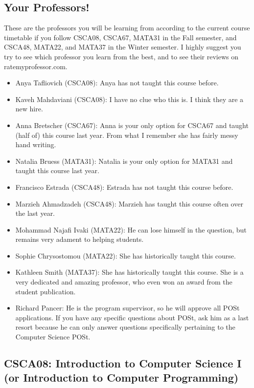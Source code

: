 \documentclass[11pt]{article}
\begin{document}
\subsection{Your Professors!}
These are the professors you will be learning from according to the current course timetable if you follow CSCA08, CSCA67, MATA31 in the Fall semester, and CSCA48, MATA22, and MATA37 in the Winter semester. I highly suggest you try to see which professor you learn from the best, and to see their reviews on ratemyprofessor.com.
\begin{itemize}
    \item Anya Tafliovich (CSCA08): Anya has not taught this course before.
    \item Kaveh Mahdaviani (CSCA08): I have no clue who this is. I think they are a new hire.
    \item Anna Bretscher (CSCA67): Anna is your only option for CSCA67 and taught (half of) this course last year. From what I remember she has fairly messy hand writing.
    \item Natalia Bruess (MATA31): Natalia is your only option for MATA31 and taught this course last year. 
    \item Francisco Estrada (CSCA48): Estrada has not taught this course before.
    \item Marzieh Ahmadzadeh (CSCA48): Marzieh has taught this course often over the last year.
    \item Mohammad Najafi Ivaki (MATA22): He can lose himself in the question, but remains very adament to helping students.
    \item Sophie Chrysostomou (MATA22): She has historically taught this course.
    \item Kathleen Smith (MATA37): She has historically taught this course. She is a very dedicated and amazing professor, who even won an award from the student publication.
    \item Richard Pancer: He is the program supervisor, so he will approve all POSt applications. If you have any specific questions about POSt, ask him as a last resort because he can only answer questions specifically pertaining to the Computer Science POSt.
\end{itemize}

\subsection{CSCA08: Introduction to Computer Science I (or Introduction to Computer Programming)}
\end{document}
